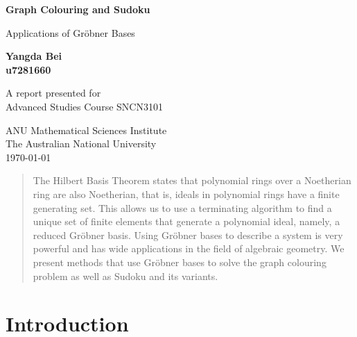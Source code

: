 \documentclass[11pt]{article}
\theoremstyle{definition}
\begin{document}
    \begin{titlepage}
        \begin{center}
            \vspace*{1cm}
     
            \textbf{Graph Colouring and Sudoku}
     
            \vspace{0.5cm}
             Applications of Gr\"obner Bases
                 
            \vspace{1.5cm}
     
            \textbf{Yangda Bei} \\
            \textbf{u7281660}
                 
            A report presented for \\
            Advanced Studies Course SNCN3101
                 
            \vspace{0.8cm}

                 
            ANU Mathematical Sciences Institute\\
            The Australian National University\\
            \today
                 
        \end{center}
    \end{titlepage}

    \begin{abstract}
        \centering
        The Hilbert Basis Theorem states that polynomial rings over a Noetherian ring are also Noetherian, that is, ideals in polynomial rings have a finite generating set. This allows us to use a terminating algorithm to find a unique set of finite elements that generate a polynomial ideal, namely, a reduced Gr\"obner basis. Using Gr\"obner bases to describe a system is very powerful and has wide applications in the field of algebraic geometry. We present methods that use Gr\"obner bases to solve the graph colouring problem as well as Sudoku and its variants.
    \end{abstract}
    

    \tableofcontents
    \pagebreak
    
    \section{Introduction}

    
\end{document}
